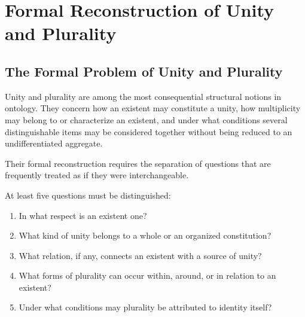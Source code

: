 %
%
%
%

\section{Formal Reconstruction of Unity and Plurality}
\label{sec:formal-reconstruction-of-unity-and-plurality}

\subsection{The Formal Problem of Unity and Plurality}

Unity and plurality are among the most consequential
structural notions in ontology. They concern how an
existent may constitute a unity, how multiplicity may
belong to or characterize an existent, and under what
conditions several distinguishable items may be
considered together without being reduced to an
undifferentiated aggregate.

Their formal reconstruction requires the separation
of questions that are frequently treated as if they
were interchangeable.

At least five questions must be distinguished:

\begin{enumerate}
    \item In what respect is an existent one?
    \item What kind of unity belongs to a whole or
    an organized constitution?
    \item What relation, if any, connects an existent
    with a source of unity?
    \item What forms of plurality can occur within,
    around, or in relation to an existent?
    \item Under what conditions may plurality be
    attributed to identity itself?
\end{enumerate}

